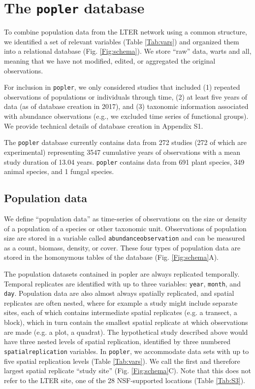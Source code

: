 \documentclass{article}\usepackage[]{graphicx}\usepackage[]{color}
\begin{document}
\section*{The \texttt{popler} database}
To combine population data from the LTER network using a common structure, we identified a set of relevant variables (Table \ref{Tab:vars}) and organized them into a relational database (Fig. \ref{Fig:schema}). We store ``raw'' data, warts and all, meaning that we have not modified, edited, or aggregated the original observations. 

For inclusion in \texttt{popler}, we only considered studies that included (1) repeated observations of populations or individuals through time, (2) at least five years of data (as of database creation in 2017), and (3) taxonomic information associated with abundance observations (e.g., we excluded time series of functional groups). We provide technical details of database creation in Appendix S1.


The \texttt{popler} database currently contains data from 272 studies (272 of which are experimental) representing 3547 cumulative years of observations with a mean study duration of 13.04 years. \texttt{popler} contains data from 691 plant species, 349 animal species, and 1 fungal species.

\subsection*{Population data}
We define ``population data'' as time-series of observations on the size or density of a population of a species or other taxonomic unit. Observations of population size are stored in a variable called \texttt{abundance\textunderscore observation} and can be measured as a count, biomass, density, or cover. These four types of population data are stored in the homonymous tables of the database (Fig. \ref{Fig:schema}A).

The population datasets contained in popler are always replicated temporally. Temporal replicates are identified with up to three variables: \texttt{year}, \texttt{month}, and \texttt{day}. Population data are also almost always spatially replicated, and spatial replicates are often nested, where for example a study might include separate sites, each of which contains intermediate spatial replicates (e.g. a transect, a block), which in turn contain the smallest spatial replicate at which observations are made (e.g. a plot, a quadrat). The hypothetical study described above would have three nested levels of spatial replication, identified by three numbered \texttt{spatial\textunderscore replication} variables. In \texttt{popler}, we accommodate data sets with up to five spatial replication levels (Table \ref{Tab:vars}). We call the first and therefore largest spatial replicate ``study site'' (Fig. \ref{Fig:schema}C). Note that this does not refer to the LTER site, one of the 28 NSF-supported locations (Table \ref{Tab:S3}).
\end{document}
